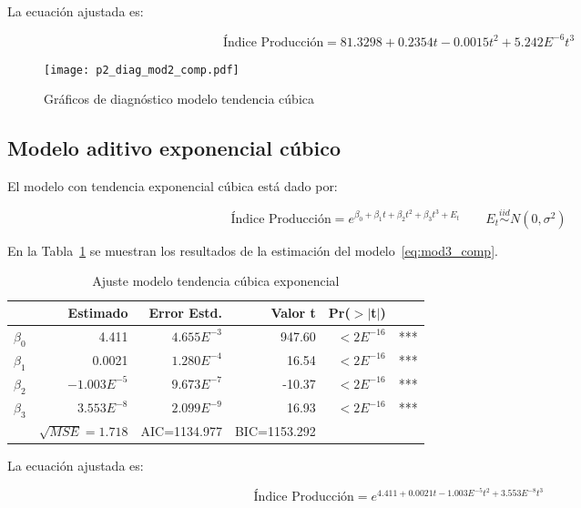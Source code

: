 \documentclass{tufte-handout}
\begin{document}
La ecuación ajustada es:

\begin{equation}
	\text{Índice Producción} = 81.3298 + 0.2354 t - 0.0015 t^2 + 5.242E^{-6} t^3
\end{equation}

\begin{figure*}[!ht]
    \texttt{[image: p2\_diag\_mod2\_comp.pdf]}
    \caption{Gráficos de diagnóstico modelo tendencia cúbica}
    \label{fig:p2_diag_mod2_comp.pdf}
\end{figure*}

\subsection*{Modelo aditivo exponencial cúbico}

El modelo con tendencia exponencial cúbica está dado por:

\begin{equation} \label{eq:mod3_comp}
	\text{Índice Producción} = e^{\beta_0 + \beta_1 t + \beta_2 t^2 + \beta_3 t^3 + E_t}
	\qquad E_t \stackrel{iid}{\sim} N(0, \sigma^2)
\end{equation}

En la Tabla~\ref{tab:mod3_comp} se muestran los resultados de la estimación del modelo~\ref{eq:mod3_comp}.

\begin{table}[ht]
\centering
\begin{tabular}{lrrrrl}
          & Estimado & Error Estd. & Valor t & Pr($>$$|$t$|$) & \\ 
  \hline
$\beta_0$ & 4.411 & $4.655E^{-3}$ & 947.60 & $<2E^{-16}$ & *** \\ 
  $\beta_1$ & 0.0021 & $1.280E^{-4}$ & 16.54 & $<2E^{-16}$ & *** \\ 
  $\beta_2$ & $-1.003E^{-5}$ & $9.673E^{-7}$ & -10.37 & $<2E^{-16}$ & *** \\ 
  $\beta_3$ & $3.553E^{-8}$ & $2.099E^{-9}$ & 16.93 & $<2E^{-16}$ & *** \\ 
   \hline
   & $\sqrt{MSE}=1.718$ & AIC=1134.977 & BIC=1153.292 & \\
   \hline
\end{tabular}
\caption{Ajuste modelo tendencia cúbica exponencial} 
\label{tab:mod3_comp}
\end{table}

La ecuación ajustada es:

\begin{equation}
	\text{Índice Producción} = e^{4.411 + 0.0021 t - 1.003E^{-5} t^2 + 3.553E^{-8} t^3}
\end{equation}
\end{document}
